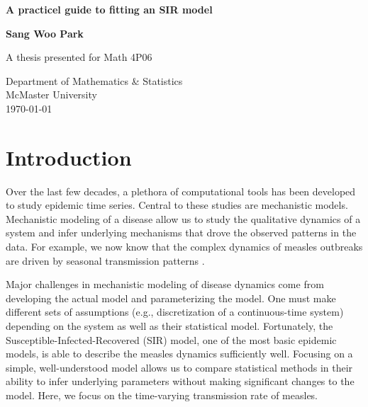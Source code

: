 \documentclass{article}
\begin{document}
\begin{titlepage}
   \begin{center}
       \vspace*{1cm}
 
       \textbf{A practicel guide to fitting an SIR model}
 
       \vspace{1.5cm}
 
       \textbf{Sang Woo Park}
 
       \vfill
 
       A thesis presented for Math 4P06\\
 
       \vspace{0.8cm}
 
       Department of Mathematics \& Statistics\\
       McMaster University\\
       \today
 
   \end{center}
\end{titlepage}
\pagebreak

\tableofcontents

\pagebreak

\section{Introduction}

Over the last few decades, a plethora of computational tools has been developed to study epidemic time series.
Central to these studies are mechanistic models.
Mechanistic modeling of a disease allow us to study the qualitative dynamics of a system and infer underlying mechanisms that drove the observed patterns in the data.
For example, we now know that the complex dynamics of measles outbreaks are driven by seasonal transmission patterns \citep{earn2000simple, dalziel2016persistent}.

Major challenges in mechanistic modeling of disease dynamics come from developing the actual model and parameterizing the model.
One must make different sets of assumptions (e.g., discretization of a continuous-time system) depending on the system as well as their statistical model.
Fortunately, the Susceptible-Infected-Recovered (SIR) model, one of the most basic epidemic models, is able to describe the measles dynamics sufficiently well.
Focusing on a simple, well-understood model allows us to compare statistical methods in their ability to infer underlying parameters without making significant changes to the model.
Here, we focus on the time-varying transmission rate of measles.
\end{document}
